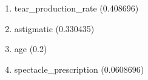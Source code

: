 \begin{enumerate}
\item tear\_production\_rate (0.408696)
\item astigmatic (0.330435)
\item age (0.2)
\item spectacle\_prescription (0.0608696)
\end{enumerate}